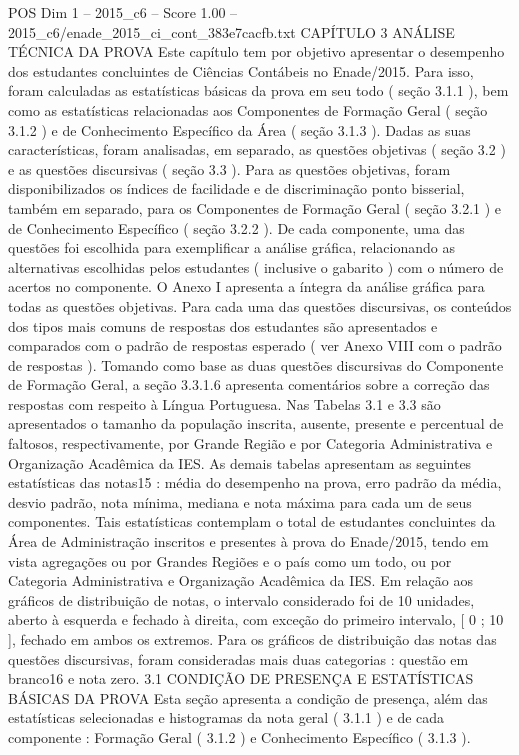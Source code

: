 \begin{textsample}{POS Dim 1 – 2015\_c6 – Score 1.00 – 2015\_c6/enade\_2015\_ci\_cont\_383e7cacfb.txt}  \label{ex:f1_pos_157}
CAPÍTULO 3 ANÁLISE TÉCNICA DA PROVA Este capítulo tem por objetivo apresentar o desempenho dos estudantes concluintes de Ciências Contábeis no Enade/2015.
Para isso, foram calculadas as estatísticas básicas da prova em seu todo ( seção 3.1.1 ), bem como as estatísticas relacionadas aos Componentes de Formação Geral ( seção 3.1.2 ) e de Conhecimento Específico da Área ( seção 3.1.3 ).
Dadas as suas características, foram analisadas, em separado, as questões objetivas ( seção 3.2 ) e as questões discursivas ( seção 3.3 ).
Para as questões objetivas, foram disponibilizados os índices de facilidade e de discriminação ponto bisserial, também em separado, para os Componentes de Formação Geral ( seção 3.2.1 ) e de Conhecimento Específico ( seção 3.2.2 ).
De cada componente, uma das questões foi escolhida para exemplificar a análise gráfica, relacionando as alternativas escolhidas pelos estudantes ( inclusive o gabarito ) com o número de acertos no componente.
O Anexo I apresenta a íntegra da análise gráfica para todas as questões objetivas.
Para cada uma das questões discursivas, os conteúdos dos tipos mais comuns de respostas dos estudantes são apresentados e comparados com o padrão de respostas esperado ( ver Anexo VIII com o padrão de respostas ).
Tomando como base as duas questões discursivas do Componente de Formação Geral, a seção 3.3.1.6 apresenta comentários sobre a correção das respostas com respeito à Língua Portuguesa.
Nas Tabelas 3.1 e 3.3 são apresentados o tamanho da população inscrita, ausente, presente e percentual de faltosos, respectivamente, por Grande Região e por Categoria Administrativa e Organização Acadêmica da IES.
As demais tabelas apresentam as seguintes estatísticas das notas15 : média do desempenho na prova, erro padrão da média, desvio padrão, nota mínima, mediana e nota máxima para cada um de seus componentes.
Tais estatísticas contemplam o total de estudantes concluintes da Área de Administração inscritos e presentes à prova do Enade/2015, tendo em vista agregações ou por Grandes Regiões e o país como um todo, ou por Categoria Administrativa e Organização Acadêmica da IES.
Em relação aos gráficos de distribuição de notas, o intervalo considerado foi de 10 unidades, aberto à esquerda e fechado à direita, com exceção do primeiro intervalo, [ 0 ; 10 ], fechado em ambos os extremos.
Para os gráficos de distribuição das notas das questões discursivas, foram consideradas mais duas categorias : questão em branco16 e nota zero. 3.1 CONDIÇÃO DE PRESENÇA E ESTATÍSTICAS BÁSICAS DA PROVA Esta seção apresenta a condição de presença, além das estatísticas selecionadas e histogramas da nota geral ( 3.1.1 ) e de cada componente : Formação Geral ( 3.1.2 ) e Conhecimento Específico ( 3.1.3 ).

\end{textsample}
